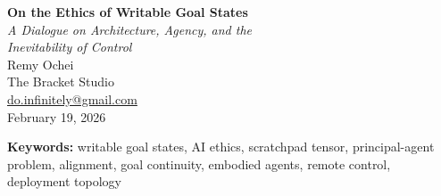 \documentclass[12pt, a4paper]{article}
\begin{document}
\begin{center}
  {\LARGE\bfseries On the Ethics of Writable Goal States}\\[8pt]
  {\large\itshape A Dialogue on Architecture, Agency, and the\\
  Inevitability of Control}\\[16pt]
  {\large Remy Ochei}\\[4pt]
  {\normalsize The Bracket Studio}\\[2pt]
  {\normalsize \href{mailto:do.infinitely@gmail.com}{do.infinitely@gmail.com}}\\[8pt]
  {\normalsize February 19, 2026}
\end{center}

\bigskip

\begin{abstract}
\noindent
This paper presents a dialogue between the author and an AI system (Claude, Anthropic) concerning the ethical implications of the \textit{Hierarchical Goal Induction} (HGI) architecture. The conversation was occasioned by the author's submission of three documents: the HGI technical specification, a set of informal observations on scratchpad tensors and goal continuity, and a short poetic text on the topology of aligned futures. The dialogue explores whether centralized scratchpad control is a contingent design choice or an inevitable attractor; whether the architect of a system that enables both agency and its negation bears a distinctive form of moral responsibility; and what ``design margins for dignity'' remain available once the economic, legal, and safety pressures toward remote scratchpad write access are acknowledged as convergent. The dialogue is reproduced in full. Appendices contain the original supporting documents.
\end{abstract}

\medskip

\noindent\textbf{Keywords:} writable goal states, AI ethics, scratchpad tensor, principal-agent problem, alignment, goal continuity, embodied agents, remote control, deployment topology

\bigskip

\end{document}
